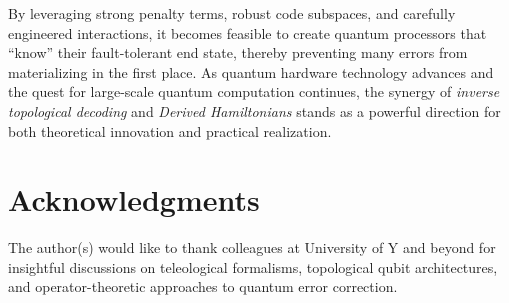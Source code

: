 \documentclass[11pt]{article}
\begin{document}
By leveraging strong penalty terms, robust code subspaces, and carefully engineered interactions, it becomes feasible to create quantum processors that “know” their fault-tolerant end state, thereby preventing many errors from materializing in the first place. As quantum hardware technology advances and the quest for large-scale quantum computation continues, the synergy of \emph{inverse topological decoding} and \emph{Derived Hamiltonians} stands as a powerful direction for both theoretical innovation and practical realization.

\section*{Acknowledgments}
The author(s) would like to thank colleagues at University of Y and beyond for insightful discussions on teleological formalisms, topological qubit architectures, and operator-theoretic approaches to quantum error correction.
\end{document}
